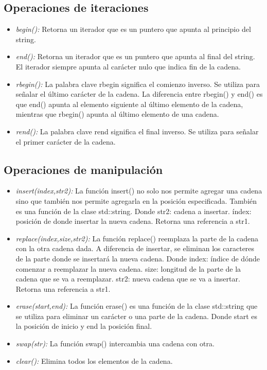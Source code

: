 \subsection{Operaciones de iteraciones}
\begin{itemize}
	\item \emph{begin():} Retorna un iterador que es un puntero que apunta al principio del string.  
	\item \emph{end():} Retorna un iterador que es un puntero que apunta al final del string. El iterador siempre apunta al carácter nulo que indica fin de la cadena. 
	\item \emph{rbegin():} La palabra clave rbegin significa el comienzo inverso. Se utiliza para señalar el último carácter de la cadena. La diferencia entre rbegin() y end() es que end() apunta al elemento siguiente al último elemento de la cadena, mientras que rbegin() apunta al último elemento de una cadena.
	\item \emph{rend():} La palabra clave rend significa el final inverso. Se utiliza para señalar el primer carácter de la cadena.
\end{itemize}
\subsection{Operaciones de manipulación}
\begin{itemize}
	\item \emph{insert(index,str2):} La función insert() no solo nos permite agregar una cadena sino que también nos permite agregarla en la posición especificada. También es una función de la clase std::string. Donde str2: cadena a insertar. índex: posición de donde insertar la nueva cadena. Retorna una referencia a str1.
	\item \emph{replace(index,size,str2):} La función replace() reemplaza la parte de la cadena con la otra cadena dada. A diferencia de insertar, se eliminan los caracteres de la parte donde se insertará la nueva cadena. Donde index: índice de dónde comenzar a reemplazar la nueva cadena. size: longitud de la parte de la cadena que se va a reemplazar. str2: nueva cadena que se va a insertar. Retorna una referencia a str1.
	\item \emph{erase(start,end):} La función erase() es una función de la clase std::string que se utiliza para eliminar un carácter o una parte de la cadena. Donde start es la posición de inicio y end la posición final.
	\item \emph{swap(str):} La función swap() intercambia una cadena con otra.
	\item \emph{clear():} Elimina todos los elementos de la cadena.
\end{itemize}
